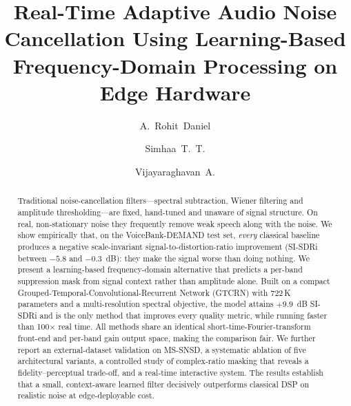 \documentclass[runningheads]{llncs}
\begin{document}
\title{Real-Time Adaptive Audio Noise Cancellation Using Learning-Based
Frequency-Domain Processing on Edge Hardware}


\author{A.~Rohit~Daniel \and Simhaa~T.~T. \and Vijayaraghavan~A.}

\maketitle

\begin{abstract}
Traditional noise-cancellation filters---spectral subtraction, Wiener filtering
and amplitude thresholding---are fixed, hand-tuned and unaware of signal
structure. On real, non-stationary noise they frequently remove weak speech
along with the noise. We show empirically that, on the VoiceBank-DEMAND test
set, \emph{every} classical baseline produces a negative scale-invariant
signal-to-distortion-ratio improvement (SI-SDRi between $-5.8$ and $-0.3$~dB):
they make the signal worse than doing nothing. We present a learning-based
frequency-domain alternative that predicts a per-band suppression mask from
signal context rather than amplitude alone. Built on a compact
Grouped-Temporal-Convolutional-Recurrent Network (GTCRN) with
722\,K parameters and a multi-resolution spectral objective, the model attains
$+9.9$~dB SI-SDRi and is the only method that improves every quality metric,
while running faster than 100$\times$ real time. All methods share an identical
short-time-Fourier-transform front-end and per-band gain output space, making
the comparison fair. We further report an external-dataset validation on
MS-SNSD, a systematic ablation of five architectural variants, a controlled
study of complex-ratio masking that reveals a fidelity--perceptual trade-off,
and a real-time interactive system. The results establish that a small,
context-aware learned filter decisively outperforms classical DSP on realistic
noise at edge-deployable cost.
\end{abstract}
\end{document}
